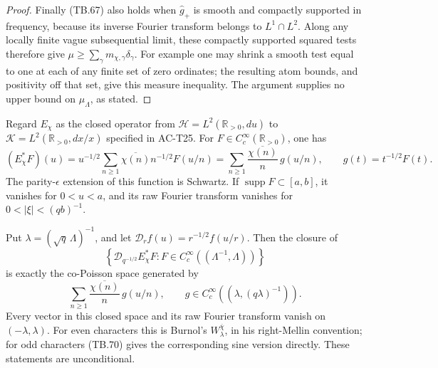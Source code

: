 \begin{proof}
Finally (TB.67) also holds when \(\widehat g_+\) is smooth
and compactly supported in frequency, because its inverse
Fourier transform belongs to \(L^1\cap L^2\).
Along any locally finite vague subsequential limit, these
compactly supported squared tests therefore give
\(\mu\geq\sum_\gamma m_{\chi,\gamma}\delta_\gamma\).
For example one may shrink a smooth test equal to one at
each of any finite set of zero ordinates; the resulting
atom bounds, and positivity off that set, give this measure
inequality.  The argument supplies no upper bound on
\(\mu_\Lambda\), as stated.
\end{proof}

\begin{proposition}
\label{AC-T32}
Regard \(E_\chi\) as the closed operator from
\(\mathcal H=L^2(\mathbb R_{>0},du)\) to
\(\mathcal K=L^2(\mathbb R_{>0},dx/x)\) specified in AC-T25.
For \(F\in C_c^\infty(\mathbb R_{>0})\), one has
\[
 (E_\chi^*F)(u)
   =u^{-1/2}\sum_{n\geq1}\overline{\chi(n)}n^{-1/2}F(u/n)
   =\sum_{n\geq1}\frac{\overline{\chi(n)}}n\,g(u/n),
 \qquad g(t)=t^{-1/2}F(t).
 \tag{TB.68}
\]
The parity-\(\epsilon\) extension of this function is Schwartz.
If \(\operatorname{supp}F\subset[a,b]\), it vanishes for
\(0<u<a\), and its raw Fourier transform vanishes for
\(0<|\xi|<(qb)^{-1}\).

Put \(\lambda=(\sqrt q\,\Lambda)^{-1}\), and let
\(\mathscr D_r f(u)=r^{-1/2}f(u/r)\).
Then the closure of
\[
 \left\{\mathscr D_{q^{-1/2}}E_\chi^*F:
                   F\in C_c^\infty((\Lambda^{-1},\Lambda))\right\}
 \tag{TB.69}
\]
is exactly the co-Poisson space generated by
\[
 \sum_{n\geq1}\frac{\overline{\chi(n)}}n\,g(u/n),
       \qquad
 g\in C_c^\infty((\lambda,(q\lambda)^{-1})).
 \tag{TB.70}
\]
Every vector in this closed space and its raw Fourier
transform vanish on \((-\lambda,\lambda)\).
For even characters this is Burnol's
\(W_\lambda^{\overline\chi}\), in his right-Mellin convention;
for odd characters (TB.70) gives the corresponding sine
version directly.
These statements are unconditional.
\end{proposition}
